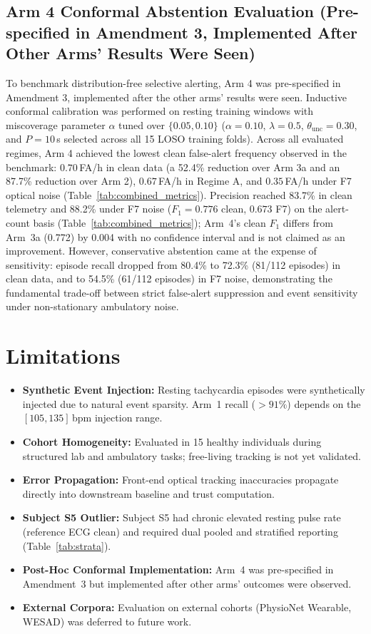 \documentclass[conference]{IEEEtran}
\begin{document}
\subsection{Arm 4 Conformal Abstention Evaluation (Pre-specified in Amendment 3, Implemented After Other Arms' Results Were Seen)}
To benchmark distribution-free selective alerting, Arm 4 was pre-specified in Amendment 3, implemented after the other arms' results were seen. Inductive conformal calibration was performed on resting training windows with miscoverage parameter $\alpha$ tuned over $\{0.05, 0.10\}$ ($\alpha = 0.10$, $\lambda = 0.5$, $\theta_{\text{unc}} = 0.30$, and $P = 10$\,s selected across all 15 LOSO training folds). Across all evaluated regimes, Arm 4 achieved the lowest clean false-alert frequency observed in the benchmark: $0.70$\,FA/h in clean data (a 52.4\% reduction over Arm 3a and an 87.7\% reduction over Arm 2), $0.67$\,FA/h in Regime A, and $0.35$\,FA/h under F7 optical noise (Table~\ref{tab:combined_metrics}). Precision reached 83.7\% in clean telemetry and 88.2\% under F7 noise ($F_1 = 0.776$ clean, $0.673$ F7) on the alert-count basis (Table~\ref{tab:combined_metrics}); Arm~4's clean $F_1$ differs from Arm~3a (0.772) by 0.004 with no confidence interval and is not claimed as an improvement. However, conservative abstention came at the expense of sensitivity: episode recall dropped from 80.4\% to 72.3\% (81/112 episodes) in clean data, and to 54.5\% (61/112 episodes) in F7 noise, demonstrating the fundamental trade-off between strict false-alert suppression and event sensitivity under non-stationary ambulatory noise.

\section{Limitations}
\begin{itemize}
    \item \textbf{Synthetic Event Injection:} Resting tachycardia episodes were synthetically injected due to natural event sparsity. Arm~1 recall ($>91\%$) depends on the $[105, 135]$\,bpm injection range.
    \item \textbf{Cohort Homogeneity:} Evaluated in 15 healthy individuals during structured lab and ambulatory tasks; free-living tracking is not yet validated.
    \item \textbf{Error Propagation:} Front-end optical tracking inaccuracies propagate directly into downstream baseline and trust computation.
    \item \textbf{Subject S5 Outlier:} Subject S5 had chronic elevated resting pulse rate (reference ECG clean) and required dual pooled and stratified reporting (Table~\ref{tab:strata}).
    \item \textbf{Post-Hoc Conformal Implementation:} Arm~4 was pre-specified in Amendment~3 but implemented after other arms' outcomes were observed.
    \item \textbf{External Corpora:} Evaluation on external cohorts (PhysioNet Wearable, WESAD) was deferred to future work.
\end{itemize}
\end{document}
